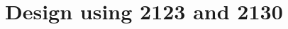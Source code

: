 \section{Design using 2123 and 2130}

\begin{center}

\begin{center}


\end{center}

\end{center}

\vspace{0.2cm}
